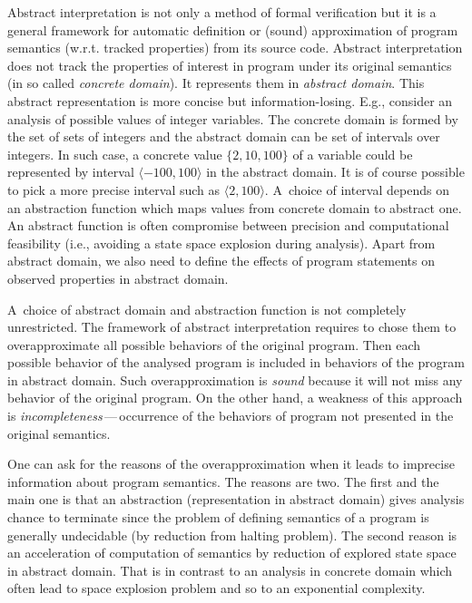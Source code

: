 \documentclass[a4paper, 12pt]{article}
\newcommand{\interval}[2]{\langle #1,#2 \rangle}
\begin{document}
Abstract interpretation is not only a method of formal verification but
it is a general framework for automatic definition or (sound) approximation of
program semantics (w.r.t. tracked properties) from its source code.
Abstract interpretation does not track the properties of interest
in program under its original semantics (in so called \emph{concrete domain}).
It represents them in \emph{abstract domain}.
This abstract representation is more concise but information-losing.
E.g., consider an analysis of possible values of integer variables.
The concrete domain is formed by the set of sets of integers
and the abstract domain can be set of intervals over integers.
In such case, a concrete value $\{2,10,100\}$ of a variable could
be represented by interval $\interval{-100}{100}$ in the abstract domain.
It is of course possible to pick a more precise interval such as $\interval{2}{100}$.
A~choice of interval depends on an abstraction function
which maps values from concrete domain to abstract one.
An abstract function is often compromise between precision and computational
feasibility (i.e., avoiding a state space explosion during analysis).
Apart from abstract domain, we also need to define the effects
of program statements on observed properties in abstract domain.

A~choice of abstract domain and abstraction function is not completely unrestricted.
The framework of abstract interpretation requires to chose them to
overapproximate all possible behaviors of the original program.
Then each possible behavior of the analysed program is included in
behaviors of the program in abstract domain.
Such overapproximation is \emph{sound} because it will not miss any
behavior of the original program.
On the other hand, a weakness of this approach is \emph{incompleteness}\,---\,occurrence of
the behaviors of program not presented in the original semantics.

One can ask for the reasons of the overapproximation when it leads to
imprecise information about program semantics.
The reasons are two.
The first and the main one is that an abstraction (representation in abstract domain) gives
analysis chance to terminate since the problem of defining semantics of a program is
generally undecidable (by reduction from halting problem).
The second reason is an acceleration of computation of semantics
by reduction of explored state space in abstract domain.
That is in contrast to an analysis in concrete domain
which often lead to space explosion problem and so to an exponential complexity.
\end{document}
